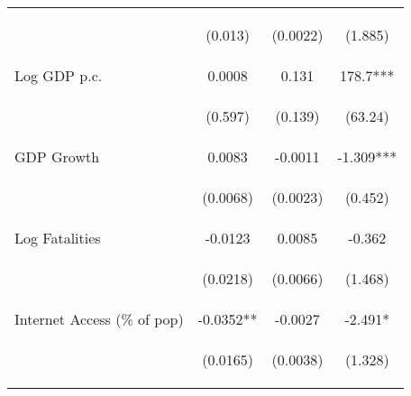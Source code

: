 \documentclass{article}
\begin{document}
\begin{table}[htbp]
{\begin{tabular}{lccc}
\vspace{4pt} & \begin{footnotesize}(0.013)\end{footnotesize} & \begin{footnotesize}(0.0022)\end{footnotesize} & \begin{footnotesize}(1.885)\end{footnotesize} \\
Log GDP p.c. & 0.0008 & 0.131 & 178.7*** \\
\vspace{4pt} & \begin{footnotesize}(0.597)\end{footnotesize} & \begin{footnotesize}(0.139)\end{footnotesize} & \begin{footnotesize}(63.24)\end{footnotesize} \\
GDP Growth & 0.0083 & -0.0011 & -1.309*** \\
\vspace{4pt} & \begin{footnotesize}(0.0068)\end{footnotesize} & \begin{footnotesize}(0.0023)\end{footnotesize} & \begin{footnotesize}(0.452)\end{footnotesize} \\
Log Fatalities & -0.0123 & 0.0085 & -0.362 \\
\vspace{4pt} & \begin{footnotesize}(0.0218)\end{footnotesize} & \begin{footnotesize}(0.0066)\end{footnotesize} & \begin{footnotesize}(1.468)\end{footnotesize} \\
Internet Access (\% of pop) & -0.0352** & -0.0027 & -2.491* \\
\vspace{4pt} & \begin{footnotesize}(0.0165)\end{footnotesize} & \begin{footnotesize}(0.0038)\end{footnotesize} & \begin{footnotesize}(1.328)\end{footnotesize} \\

\end{tabular}}
\end{table}
\end{document}
